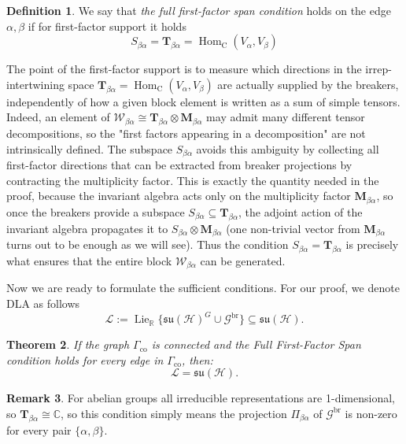 \documentclass[11pt,letterpaper]{article}
\newcounter{alg}
\theoremstyle{plain}
\theoremstyle{plain}
\theoremstyle{plain}
\theoremstyle{plain}
\theoremstyle{plain}
\theoremstyle{plain}
\newcommand{\C}{\mathbb{C}}
\newcommand{\R}{\mathbb{R}}
\newcommand{\HH}{\mathcal{H}}
\theoremstyle{plain}
\newtheorem{smtheorem}{Theorem}[section]
\theoremstyle{definition}
\newtheorem{smdefinition}[smtheorem]{Definition}
\newtheorem{smremark}[smtheorem]{Remark}
\theoremstyle{plain}
\begin{document}
\begin{smdefinition}\label{def:first_factor}
    We say that \textit{the full first-factor span condition} holds on the edge ${\alpha, \beta}$ if for first-factor support it holds
    \[
        S_{\beta \alpha}=\mathbf{T}_{\beta \alpha}=\operatorname{Hom}_{\mathrm{C}}\left(V_\alpha, V_\beta\right)
    \]
\end{smdefinition}

The point of the first-factor support is to measure which directions in the irrep-intertwining space $\mathbf{T}_{\beta\alpha}=\operatorname{Hom}_{\mathrm{C}}\left(V_\alpha, V_\beta\right)$ are actually supplied by the breakers, 
independently of how a given block element is written as a sum of simple tensors. Indeed, an element of $\mathcal{W}_{\beta \alpha} \cong \mathbf{T}_{\beta \alpha} \otimes \mathbf{M}_{\beta \alpha}$ 
may admit many different tensor decompositions, so the "first factors appearing in a decomposition" are not intrinsically defined. The subspace $S_{\beta \alpha}$ avoids this ambiguity by collecting 
all first-factor directions that can be extracted from breaker projections by contracting the multiplicity factor. 
This is exactly the quantity needed in the proof, because the invariant algebra acts only on the multiplicity factor $\mathbf{M}_{\beta \alpha}$, so once the breakers provide a subspace $S_{\beta \alpha} \subseteq\mathbf{T}_{\beta \alpha}$, 
the adjoint action of the invariant algebra propagates it to $S_{\beta \alpha} \otimes \mathbf{M}_{\beta \alpha}$ (one non-trivial vector from $\mathbf{M}_{\beta \alpha}$ turns out to be enough as we will see). Thus the condition $S_{\beta \alpha}=\mathbf{T}_{\beta \alpha}$ 
is precisely what ensures that the entire block $\mathcal{W}_{\beta \alpha}$ can be generated.

Now we are ready to formulate the sufficient conditions. For our proof, we denote DLA as follows
\begin{equation}\label{eq:DLA_with_breakers}
    \mathcal{L}:=\operatorname{Lie}_{\R}\{\mathfrak{su}(\HH)^G \cup \mathcal{G}^{\text{br}}\} \subseteq \mathfrak{su}(\HH).
\end{equation}
\begin{smtheorem} \label{thm:main_real}
    If the graph $\Gamma_{\mathrm{co}}$ is connected and the Full First-Factor Span condition holds for every edge in $\Gamma_{\mathrm{co}}$, then:
    \begin{equation*}
        \mathcal{L} = \mathfrak{su}(\HH).
    \end{equation*}
\end{smtheorem}
\begin{smremark}
    For abelian groups all irreducible representations are 1-dimensional, so $\mathbf{T}_{\beta\alpha} \cong \C$, so this condition simply means the projection $\Pi_{\beta \alpha}$ of $\mathcal{G}^{\text{br}}$ is non-zero
    for every pair $\{\alpha, \beta\}$.
\end{smremark}
\end{document}
